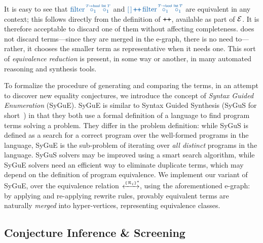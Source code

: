 It is easy to see that 
$\clrterm\tfilter\pholder{1}{\!T\!\to\tbool}\pholder{1}{\tlist\,T}$ and $\clrterm\lnil \concat
  \tfilter\pholder{1}{\!T\!\to\tbool}\pholder{1}{\tlist\,T}$
are equivalent in any context; this follows directly from the definition of $\concat$, available as part of $\mathcal{E}$. 
It is therefore acceptable to discard one of them without affecting completeness.
\TheSy does not discard terms---since they are merged in the e-graph, there is no need to---rather, it chooses the smaller term as representative when it needs one.
This sort of \emph{equivalence reduction} is present, in some way or another, in many automated reasoning and synthesis tools.

To formalize the procedure of generating and comparing the terms,
in an attempt to discover new equality conjectures,
we introduce the concept of \emph{Syntax Guided Enumeration} (SyGuE).
SyGuE is similar to Syntax Guided Synthesis (SyGuS for short~\cite{DSSE2015:Alur}) in that they both use a formal definition of a language to find program terms solving a problem.
They differ in the problem definition: while SyGuS is defined as a search for a correct program over the well-formed programs in the language,
SyGuE is the sub-problem of iterating over \emph{all distinct} programs in the language.
SyGuS solvers may be improved using a smart search algorithm, while SyGuE solvers need an efficient way to eliminate duplicate terms, which may depend on the definition of program equivalence.
We implement our variant of SyGuE, over the equivalence relation ${\!} \xleftrightarrow[]{\scriptscriptstyle\{\mathcal{R}_i\}^*\!\!} {\!\!}$, using the aforementioned e-graph:
by applying and re-applying rewrite rules,
provably equivalent terms are naturally \emph{merged} into hyper-vertices, representing equivalence classes.

\subsection{Conjecture Inference \& Screening}
\label{overview:conjecture}

